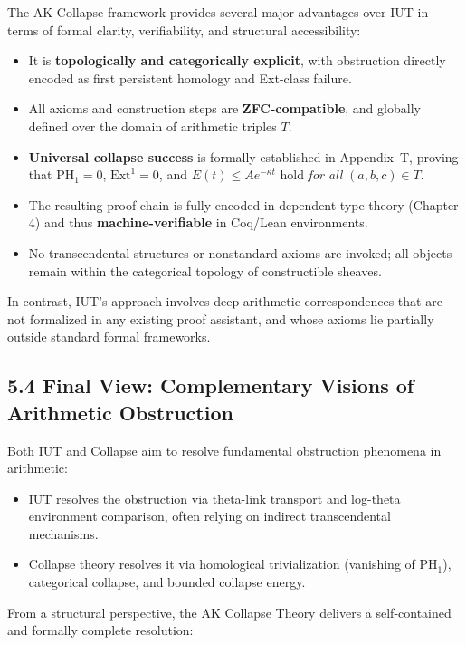 \documentclass[11pt]{article}
\begin{document}
The AK Collapse framework provides several major advantages over IUT in terms of formal clarity, verifiability, and structural accessibility:
\begin{itemize}
    \item It is \textbf{topologically and categorically explicit}, with obstruction directly encoded as first persistent homology and Ext-class failure.
    \item All axioms and construction steps are \textbf{ZFC-compatible}, and globally defined over the domain of arithmetic triples \( T \).
    \item \textbf{Universal collapse success} is formally established in Appendix~T, proving that \( \mathrm{PH}_1 = 0 \), \( \mathrm{Ext}^1 = 0 \), and \( E(t) \leq Ae^{-\kappa t} \) hold \emph{for all} \( (a,b,c) \in T \).
    \item The resulting proof chain is fully encoded in dependent type theory (Chapter 4) and thus \textbf{machine-verifiable} in Coq/Lean environments.
    \item No transcendental structures or nonstandard axioms are invoked; all objects remain within the categorical topology of constructible sheaves.
\end{itemize}

In contrast, IUT’s approach involves deep arithmetic correspondences that are not formalized in any existing proof assistant, and whose axioms lie partially outside standard formal frameworks.

\subsection{5.4 Final View: Complementary Visions of Arithmetic Obstruction}

Both IUT and Collapse aim to resolve fundamental obstruction phenomena in arithmetic:

\begin{itemize}
    \item IUT resolves the obstruction via theta-link transport and log-theta environment comparison, often relying on indirect transcendental mechanisms.
    \item Collapse theory resolves it via homological trivialization (vanishing of \( \mathrm{PH}_1 \)), categorical collapse, and bounded collapse energy.
\end{itemize}

From a structural perspective, the AK Collapse Theory delivers a self-contained and formally complete resolution:
\end{document}
